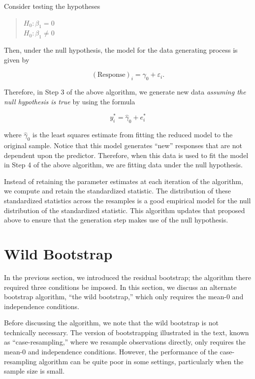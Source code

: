 \documentclass[
  letterpaper,
  DIV=11,
  numbers=noendperiod]{scrreprt}
\theoremstyle{definition}
\theoremstyle{definition}
\theoremstyle{plain}
\theoremstyle{remark}
\begin{document}
Consider testing the hypotheses

\begin{quote}
\(H_0: \beta_1 = 0\)\\
\(H_0: \beta_1 \neq 0\)
\end{quote}

Then, under the null hypothesis, the model for the data generating
process is given by

\[(\text{Response})_i = \gamma_0 + \varepsilon_i.\]

Therefore, in Step 3 of the above algorithm, we generate new data
\emph{assuming the null hypothesis is true} by using the formula

\[y_i^* = \widehat{\gamma}_0 + e_i^*\]

where \(\widehat{\gamma}_0\) is the least squares estimate from fitting
the reduced model to the original sample. Notice that this model
generates ``new'' responses that are not dependent upon the predictor.
Therefore, when this data is used to fit the model in Step 4 of the
above algorithm, we are fitting data under the null hypothesis.

Instead of retaining the parameter estimates at each iteration of the
algorithm, we compute and retain the standardized statistic. The
distribution of these standardized statistics across the resamples is a
good empirical model for the null distribution of the standardized
statistic. This algorithm updates that proposed above to ensure that the
generation step makes use of the null hypothesis.

\hypertarget{wild-bootstrap}{%
\section{Wild Bootstrap}\label{wild-bootstrap}}

In the previous section, we introduced the residual bootstrap; the
algorithm there required three conditions be imposed. In this section,
we discuss an alternate bootstrap algorithm, ``the wild bootstrap,''
which only requires the mean-0 and independence conditions.

Before discussing the algorithm, we note that the wild bootstrap is not
technically necessary. The version of bootstrapping illustrated in the
text, known as ``case-resampling,'' where we resample observations
directly, only requires the mean-0 and independence conditions. However,
the performance of the case-resampling algorithm can be quite poor in
some settings, particularly when the sample size is small.
\end{document}
